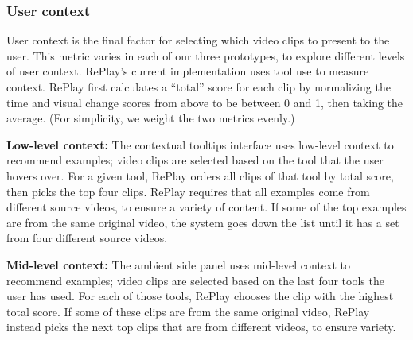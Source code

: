 \subsubsection{User context}
User context is the final factor for selecting which video clips to present to the user. This metric varies in each of our three prototypes, to explore different levels of user context. RePlay's current implementation uses tool use to measure context. RePlay first calculates a ``total'' score for each clip by normalizing the time and visual change scores from above to be between 0 and 1, then taking the average. (For simplicity, we weight the two metrics evenly.) 

\textbf{Low-level context:} The contextual tooltips interface uses low-level context to recommend examples; video clips are selected based on the tool that the user hovers over. For a given tool, RePlay orders all clips of that tool by total score, then picks the top four clips. RePlay requires that all examples come from different source videos, to ensure a variety of content. If some of the top examples are from the same original video, the system goes down the list until it has a set from four different source videos. %

\textbf{Mid-level context:} The ambient side panel uses mid-level context to recommend examples; video clips are selected based on the last four tools the user has used. For each of those tools, RePlay chooses the clip with the highest total score. If some of these clips are from the same original video, RePlay instead picks the next top clips that are from different videos, to ensure variety.

